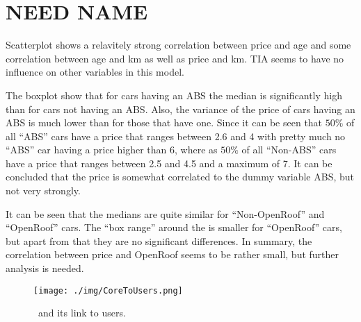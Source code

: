 \section{NEED NAME} %
\label{sec:need_name}

Scatterplot shows a relavitely strong correlation between price and age and some correlation between age and km as well as price and km. TIA seems to have no influence on other variables in this model.

The boxplot show that for cars having an ABS the median is significantly high than for cars not having an ABS. Also, the variance of the price of cars having an ABS is much lower than for those that have one.
Since it can be seen that $50\%$ of all ``ABS'' cars have a price that ranges between 2.6 and 4 with pretty much no ``ABS'' car having a price higher than 6, where as $50\%$ of all ``Non-ABS'' cars have a price that ranges between 2.5 and 4.5 and a maximum of 7. It can be concluded that the price is somewhat correlated to the dummy variable ABS, but not very strongly.

It can be seen that the medians are quite similar for ``Non-OpenRoof'' and ``OpenRoof'' cars. The ``box range'' around the is smaller for ``OpenRoof'' cars, but apart from that they are no significant differences. In summary, the correlation between price and OpenRoof seems to be rather small, but further analysis is needed.

\begin{figure}[H]
  \begin{center}
    \texttt{[image: ./img/CoreToUsers.png]}
    \end{center}
  \caption{\umld \Core~and its link to users.}
  \label{fig:core_users_uml}
\end{figure}

